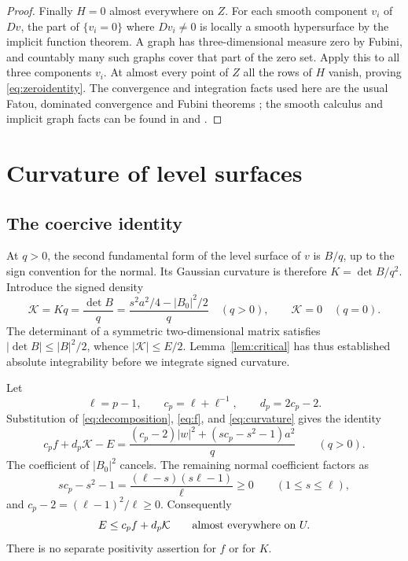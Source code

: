 \documentclass[11pt]{article}
\theoremstyle{remark}
\begin{document}
\begin{proof}
Finally $H=0$ almost everywhere on $Z$. For each smooth component
$v_i$ of $Dv$, the part of $\{v_i=0\}$ where $Dv_i\ne0$ is locally
a smooth hypersurface by the implicit function theorem. A graph
has three-dimensional measure zero by Fubini, and countably many
such graphs cover that part of the zero set. Apply this to all
three components $v_i$. At almost every point of $Z$ all the
rows of $H$ vanish, proving \eqref{eq:zeroidentity}.
The convergence and integration facts used here are the usual
Fatou, dominated convergence and Fubini theorems
\cite[Sections 1.4 and 1.7]{TaoMeasure}; the smooth calculus and
implicit graph facts can be found in
\cite[Sections 4.3 and 5.3]{LeblI} and
\cite[Sections 8.3, 8.5 and 8.6]{LeblII}.
\end{proof}

\section{Curvature of level surfaces}\label{sec:geometry}

\subsection{The coercive identity}

At $q>0$, the second fundamental form of the level surface of $v$
is $B/q$, up to the sign convention for the normal. Its Gaussian
curvature is therefore $K=\det B/q^2$. Introduce the signed density
\begin{equation}\label{eq:curvature}
 \mathcal K=Kq=\frac{\det B}{q}
   =\frac{s^2a^2/4-|B_0|^2/2}{q}
 \quad(q>0),\qquad \mathcal K=0\quad(q=0).
\end{equation}
The determinant of a symmetric two-dimensional matrix satisfies
$|\det B|\leq|B|^2/2$, whence
$|\mathcal K|\leq E/2$.
Lemma~\ref{lem:critical} has thus established absolute integrability
before we integrate signed curvature.

Let
\begin{equation}\label{eq:constants}
 \ell=p-1,\qquad c_p=\ell+\ell^{-1},\qquad d_p=2c_p-2.
\end{equation}
Substitution of \eqref{eq:decomposition}, \eqref{eq:f}, and
\eqref{eq:curvature} gives the identity
\begin{equation}\label{eq:coerciveidentity}
 c_pf+d_p\mathcal K-E
 =\frac{(c_p-2)|w|^2+(sc_p-s^2-1)a^2}{q}\qquad(q>0).
\end{equation}
The coefficient of $|B_0|^2$ cancels. The remaining normal
coefficient factors as
\[
 sc_p-s^2-1=\frac{(\ell-s)(s\ell-1)}{\ell}\geq0
 \qquad(1\leq s\leq\ell),
\]
and $c_p-2=(\ell-1)^2/\ell\geq0$. Consequently
\begin{equation}\label{eq:coercive}
 E\leq c_pf+d_p\mathcal K
 \qquad\hbox{almost everywhere on }U.
\end{equation}
There is no separate positivity assertion for $f$ or for $K$.
\end{document}
